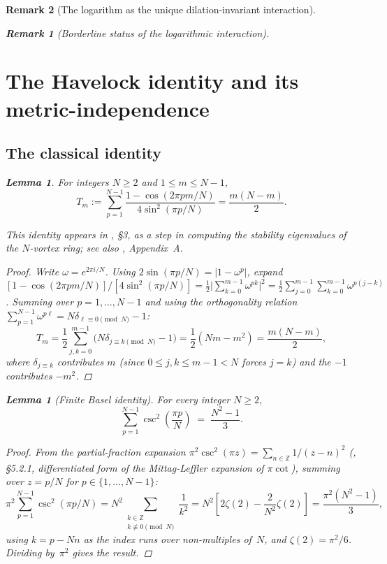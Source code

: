 \documentclass[12pt, a4paper]{article}
\newtheorem{lemma}[theorem]{Lemma}
\newtheorem{remark}{Remark}[section]
\numberwithin{equation}{section}
\begin{document}
\begin{remark}[The logarithm as the unique dilation-invariant interaction]
\begin{remark}[Borderline status of the logarithmic interaction]
\section{The Havelock identity and its metric-independence}
\label{sec:havelock-identity}

\subsection{The classical identity}
\label{sec:classical-havelock}
\label{app:havelock}

\begin{lemma}\label{lem:havelock}
For integers $N \ge 2$ and $1 \le m \le N-1$,
\[
  T_m := \sum_{p=1}^{N-1}\frac{1-\cos(2\pi pm/N)}{4\sin^2(\pi p/N)}
  = \frac{m(N-m)}{2}.
\]
\end{lemma}

This identity appears in \citet{Havelock1931}, \S3, as a step in
computing the stability eigenvalues of the $N$-vortex ring; see also
\citet{Aref2003}, Appendix~A.

\begin{proof}
Write $\omega = e^{2\pi i/N}$.  Using $2\sin(\pi p/N) =
|1 - \omega^p|$, expand
$[1 - \cos(2\pi pm/N)] / [4\sin^2(\pi p/N)]
= \frac12\bigl|\sum_{k=0}^{m-1}\omega^{pk}\bigr|^2
= \frac{1}{2}\sum_{j=0}^{m-1}\sum_{k=0}^{m-1}\omega^{p(j-k)}$.
Summing over $p = 1, \ldots, N-1$ and using the orthogonality relation
$\sum_{p=1}^{N-1}\omega^{p\ell} = N\delta_{\ell \equiv 0\pmod{N}} - 1$:
\[
  T_m = \frac{1}{2}\sum_{j,k=0}^{m-1}
  \bigl(N\delta_{j \equiv k\pmod{N}} - 1\bigr)
  = \frac{1}{2}(Nm - m^2) = \frac{m(N-m)}{2},
\]
where $\delta_{j \equiv k}$ contributes $m$ (since $0 \le j,k \le m-1
< N$ forces $j = k$) and the $-1$ contributes $-m^2$.
\end{proof}

\begin{lemma}[Finite Basel identity]\label{lem:finite-basel}
For every integer $N \ge 2$,
\begin{equation}\label{eq:finite-basel-local}
  \sum_{p=1}^{N-1}\csc^2\!\left(\frac{\pi p}{N}\right)
  \;=\; \frac{N^2-1}{3}.
\end{equation}
\end{lemma}

\begin{proof}
From the partial-fraction expansion
$\pi^2\csc^2(\pi z) = \sum_{n\in\mathbb{Z}} 1/(z-n)^2$
(\citealt{Ahlfors1979}, \S5.2.1, differentiated form of the
Mittag-Leffler expansion of $\pi\cot$), summing over
$z = p/N$ for $p \in \{1, \ldots, N{-}1\}$:
\[
  \pi^2\sum_{p=1}^{N-1}\csc^2(\pi p/N)
  = N^2 \!\!\sum_{\substack{k\in\mathbb{Z}\\k\not\equiv 0\pmod N}}\!\!
      \frac{1}{k^2}
  = N^2\left[2\zeta(2) - \frac{2}{N^2}\zeta(2)\right]
  = \frac{\pi^2(N^2 - 1)}{3},
\]
using $k = p - Nn$ as the index runs over non-multiples of~$N$,
and $\zeta(2) = \pi^2/6$.  Dividing by~$\pi^2$ gives the result.
\end{proof}


\end{remark}
\end{remark}
\end{document}
